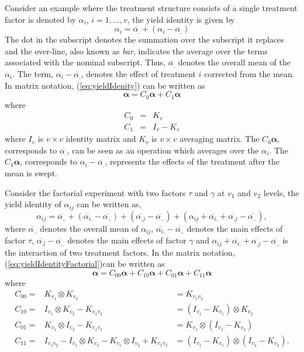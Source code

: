 \documentclass[article]{jss}
\begin{document}
Consider an example where the treatment structure consists of a single treatment factor is denoted by $\alpha_i$, $i= 1,\dots, v$, the yield identity is given by
\begin{equation}\label{eq:yieldIdenity}
\alpha_{i} = \overline{\alpha_{.}}+(\alpha_{i} -\overline{\alpha_{.}})
\end{equation}
The dot in the subscript denotes the summation over the subscript it replaces and the over-line, also known as \emph{bar}, indicates the average over the terms associated with the nominal subscript. Thus, $\overline{\alpha_{.}}$ denotes the overall mean of the $\alpha_i$. The term, $\alpha_{i} -\overline{\alpha_{.}}$, denotes the effect of treatment $i$ corrected from the mean. In matrix notation, (\ref{eq:yieldIdenity}) can be written as 
\[
\bm{\alpha} = C_0 \bm{\alpha} + C_1 \bm{\alpha}
\]
where
\begin{eqnarray}
\nonumber C_0 &=& K_v\\
\nonumber C_1 &=& I_v - K_v
\end{eqnarray}
where $I_v$ is $v \times v$ identity matrix and $K_v$ is $v \times v$ averaging matrix. The $C_0 \bm{\alpha} $, corresponds to $\overline{\alpha_{.}}$, can be seen as an operation which averages over the $\alpha_i$. The $C_1\bm{\alpha}$, corresponds to $\alpha_{i} - \overline{\alpha_{.}}$, represents the effects of the treatment after the mean is swept.

Consider the factorial experiment with two factors $\tau$ and $\gamma$ at $v_1$ and $v_2$ levels, the yield identity of $\alpha_{ij}$ can be written as,
\begin{equation}
\label{eq:yieldIdentityFactorial}
\alpha_{ij} = \overline{\alpha_{..}}+(\overline{\alpha_{i.}} -\overline{\alpha_{..}}) + (\overline{\alpha_{.j}} -\overline{\alpha_{..}}) +(\alpha_{ij} + \overline{\alpha_{i.}} + \overline{\alpha_{.j}} -\overline{\alpha_{..}}),
\end{equation}
where $\overline{\alpha_{..}}$ denotes the overall mean of $\alpha_{ij}$, $\overline{\alpha_{i.}} -\overline{\alpha_{..}}$ denotes the main effects of factor $\tau$, $\overline{\alpha_{.l}} -\overline{\alpha_{..}}$ denotes the main effects of factor $\gamma$ and $\alpha_{ij} + \overline{\alpha_{i.}} + \overline{\alpha_{.j}} -\overline{\alpha_{..}}$ is the interaction of two treatment factors. In the matrix notation, (\ref{eq:yieldIdentityFactorial})can be written as
\[
\bm{\alpha} =  C_{00} \bm{\alpha} +   C_{10} \bm{\alpha} +   C_{01} \bm{\alpha} +   C_{11} \bm{\alpha} 
\]
where
\begin{eqnarray}
\nonumber C_{00} = & K_{v_1} \otimes K_{v_2}& = K_{v_1 v_2}\\
\nonumber C_{10} = & I_{v_1} \otimes K_{v_2} - K_{v_1 v_2}& = (I_{v_1} - K_{v_1}) \otimes K_{v_2} \\
\nonumber C_{01} = &K_{v_1} \otimes I_{v_2} - K_{v_1 v_2}& =  K_{v_1} \otimes (I_{v_2} - K_{v_2})\\
\nonumber C_{11} = &I_{v_1 v_2}-I_{v_1} \otimes K_{v_2} - K_{v_1} \otimes I_{v_2} + K_{v_1 v_2} &= (I_{v_1} - K_{v_1}) \otimes (I_{v_2} - K_{v_2}).
\end{eqnarray}
\end{document}
